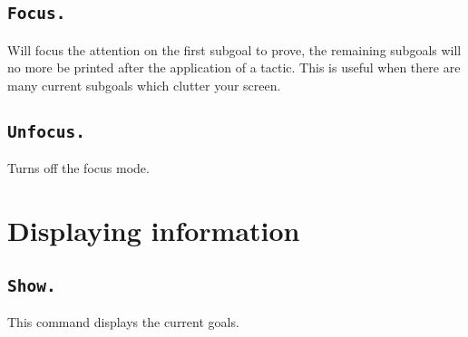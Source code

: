\subsection{\tt Focus.}
Will focus the attention on the first subgoal to prove, the remaining
subgoals will no more be printed after the application of a tactic.
This is useful when there are many current subgoals which clutter your
screen.

\subsection{\tt Unfocus.}
Turns off the focus mode.


\section{Displaying information}

\subsection{\tt Show.}\label{Show}
This command displays the current goals.

